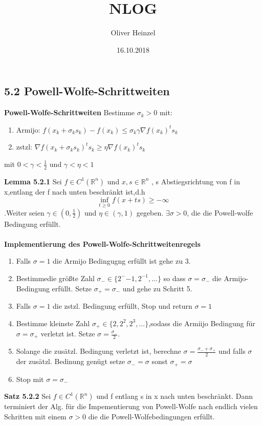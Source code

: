 \documentclass[a4paper,10pt]{article}
\title{NLOG}
\author{Oliver Heinzel}
\date{16.10.2018}
\begin{document}
\subsection*{5.2 Powell-Wolfe-Schrittweiten}
\textbf{Powell-Wolfe-Schrittweiten}
Bestimme $\sigma_k>0$ mit:
\begin{enumerate}
\item Armijo: $f(x_k+\sigma_k s_k)-f(x_k)\leq \sigma_k \gamma \nabla f(x_k)^ts_k$
\item zstzl: $\nabla f(x_k+\sigma_k s_k)^ts_k\geq \eta \nabla f(x_k)^ts_k$
\end{enumerate}
mit $0<\gamma <\frac{1}{2}$ und $\gamma<\eta <1$




\textbf{Lemma 5.2.1}
Sei $f\in C^1(\mathbb{R}^n)$ und $x,s\in \mathbb{R}^n$ , s Abstiegsrichtung von f in x,entlang der f nach unten beschränkt ist,d.h  
\begin{equation}
\inf_{t\geq 0}f(x+ts) \geq -\infty
\end{equation}
.Weiter seien $\gamma \in (0,\frac{1}{2})$  und $\eta \in (\gamma,1)$  gegeben. $\exists \sigma >0$, die die Powell-wolfe Bedingung erfüllt.
\\
\\
\textbf{Implementierung des Powell-Wolfe-Schrittweitenregels}\\
\begin{enumerate}
\item  Falls $\sigma=1$ die Armijo Bedingugng erfüllt ist gehe zu 3.
\item  Bestimmedie größte Zahl $\sigma_{-}\in \{2^-{-1},2^{-1},...\}$  so dass $\sigma=\sigma_{-}$  die Armijo-Bedingung erfüllt. Setze $\sigma_{+}=\sigma_{-}$  und gehe zu Schritt 5.
\item  Falls $\sigma=1$ die zstzl. Bedingung erfüllt, Stop und return $\sigma=1$
\item Bestimme kleinste Zahl $\sigma_{+}\in \{2,2^2,2^3,...\}$,sodass die Armiijo Bedingung für $\sigma=\sigma_{+}$ verletzt ist. Setze $\sigma=\frac{\sigma_{-}}{2}$.
\item Solange die zusätzl. Bedingung verletzt ist, berechne $\sigma=\frac{\sigma_{-}+\sigma_{+}}{2}$ und falls $\sigma$ der zusätzl. Bedinung genügt setze $\sigma_{-}=\sigma$ sonst $\sigma_{+}=\sigma$
\item Stop mit $\sigma=\sigma_{-}$
\end{enumerate}

\textbf{Satz 5.2.2}
Sei $f\in C^1(\mathbb{R}^n)$ und f entlang s in x nach unten beschränkt. Dann terminiert der Alg. für die Impementierung von Powell-Wolfe nach endlich vielen Schritten mit einem $\sigma >0$ die die Powell-Wolfebedingungen erfüllt.
\end{document}
